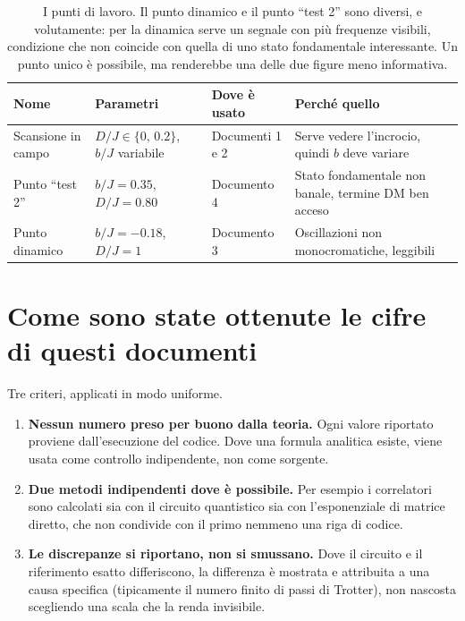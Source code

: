 \documentclass[11pt,a4paper]{article}
\begin{document}
\begin{table}[htbp]
\centering
\footnotesize
\renewcommand{\arraystretch}{1.35}
\begin{tabular}{@{}p{2.9cm}p{3.4cm}p{2.4cm}p{5.6cm}@{}}
\toprule
\rowcolor{grigetto}
\textbf{Nome} & \textbf{Parametri} & \textbf{Dove è usato} & \textbf{Perché quello} \\
\midrule
Scansione in campo & $D/J\in\{0,\,0.2\}$, $b/J$ variabile
  & Documenti 1 e 2 & Serve vedere l'incrocio, quindi $b$ deve variare \\
Punto ``test 2'' & $b/J=0.35$, $D/J=0.80$
  & Documento 4 & Stato fondamentale non banale, termine DM ben acceso \\
Punto dinamico & $b/J=-0.18$, $D/J=1$
  & Documento 3 & Oscillazioni non monocromatiche, leggibili \\
\bottomrule
\end{tabular}
\caption{I punti di lavoro. Il punto dinamico e il punto ``test 2'' sono
diversi, e volutamente: per la dinamica serve un segnale con più frequenze
visibili, condizione che non coincide con quella di uno stato fondamentale
interessante. Un punto unico è possibile, ma renderebbe una delle due figure
meno informativa.}
\end{table}

\FloatBarrier

\section{Come sono state ottenute le cifre di questi documenti}

Tre criteri, applicati in modo uniforme.

\begin{enumerate}[leftmargin=1.5em,itemsep=3pt]
\item \textbf{Nessun numero preso per buono dalla teoria.} Ogni valore riportato
proviene dall'esecuzione del codice. Dove una formula analitica esiste, viene
usata come controllo indipendente, non come sorgente.

\item \textbf{Due metodi indipendenti dove è possibile.} Per esempio i
correlatori sono calcolati sia con il circuito quantistico sia con
l'esponenziale di matrice diretto, che non condivide con il primo nemmeno una
riga di codice.

\item \textbf{Le discrepanze si riportano, non si smussano.} Dove il circuito e
il riferimento esatto differiscono, la differenza è mostrata e attribuita a una
causa specifica (tipicamente il numero finito di passi di Trotter), non
nascosta scegliendo una scala che la renda invisibile.
\end{enumerate}

\end{document}

